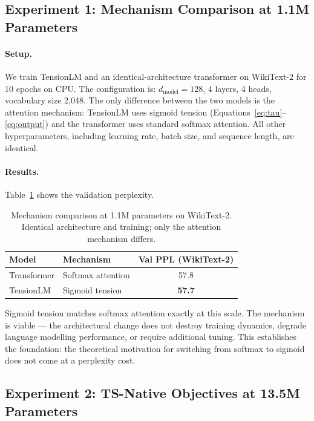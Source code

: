 \documentclass[10pt,a4paper]{article}
\begin{document}
\subsection{Experiment 1: Mechanism Comparison at 1.1M Parameters}

\paragraph{Setup.} We train TensionLM and an identical-architecture transformer on WikiText-2 for 10 epochs on CPU. The configuration is: $d_{\text{model}} = 128$, 4 layers, 4 heads, vocabulary size 2,048. The only difference between the two models is the attention mechanism: TensionLM uses sigmoid tension (Equations~\ref{eq:tau}--\ref{eq:output}) and the transformer uses standard softmax attention. All other hyperparameters, including learning rate, batch size, and sequence length, are identical.

\paragraph{Results.} Table~\ref{tab:exp1} shows the validation perplexity.

\begin{table}[h]
\centering
\caption{Mechanism comparison at 1.1M parameters on WikiText-2. Identical architecture and training; only the attention mechanism differs.}
\label{tab:exp1}
\vspace{4pt}
\begin{tabular}{llc}
\toprule
Model & Mechanism & Val PPL (WikiText-2) \\
\midrule
Transformer & Softmax attention & 57.8 \\
TensionLM & Sigmoid tension & \textbf{57.7} \\
\bottomrule
\end{tabular}
\end{table}

Sigmoid tension matches softmax attention exactly at this scale. The mechanism is viable --- the architectural change does not destroy training dynamics, degrade language modelling performance, or require additional tuning. This establishes the foundation: the theoretical motivation for switching from softmax to sigmoid does not come at a perplexity cost.

\subsection{Experiment 2: TS-Native Objectives at 13.5M Parameters}
\end{document}
